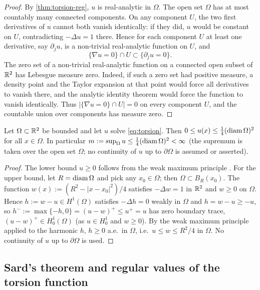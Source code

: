 \begin{proof}
By \cref{thm:torsion-reg}, $u$ is real-analytic in $\Omega$.  The open set
$\Omega$ has at most countably many connected components.  On any component
$U$, the two first derivatives of $u$ cannot both vanish identically: if they
did, $u$ would be constant on $U$, contradicting $-\Delta u=1$ there.  Hence
for each component $U$ at least one derivative, say $\partial_j u$, is a
non-trivial real-analytic function on $U$, and
\[
  \{\nabla u=0\}\cap U\subset\{\partial_j u=0\}.
\]
The zero set of a non-trivial real-analytic function on a connected open
subset of $\mathbb{R}^2$ has Lebesgue measure zero.  Indeed, if such a zero set had
positive measure, a density point and the Taylor expansion at that point
would force all derivatives to vanish there, and the analytic identity
theorem would force the function to vanish identically.  Thus
$|\{\nabla u=0\}\cap U|=0$ on every component $U$, and the countable union over
components has measure zero.
\end{proof}

\begin{lemma}\label{lem:linfty}
Let $\Omega\subset\mathbb{R}^2$ be bounded and let $u$ solve \eqref{eq:torsion}.
Then $0\le u(x)\le \tfrac14(\operatorname{diam}\Omega)^2$ for all $x\in\Omega$.
In particular $m:=\sup_{\Omega}u \le \tfrac14(\operatorname{diam}\Omega)^2<\infty$
\textup{(}the supremum is taken over the open set $\Omega$; no continuity of
$u$ up to $\partial\Omega$ is assumed or asserted\textup{)}.
\end{lemma}

\begin{proof}
The lower bound $u\ge 0$ follows from the weak maximum principle
\cite[Theorem~8.1]{GilbargTrudinger2001}.  For the upper bound, let $R=\operatorname{diam}\Omega$
and pick any $x_0\in\Omega$; then $\Omega\subset B_R(x_0)$.  The
function $w(x):=(R^2-|x-x_0|^2)/4$ satisfies $-\Delta w=1$ in $\mathbb{R}^2$ and
$w\ge 0$ on $\Omega$.  Hence $h:=w-u\in H^1(\Omega)$ satisfies $-\Delta h=0$
weakly in $\Omega$ and $h=w-u\ge -u$, so $h^-:=\max\{-h,0\}=(u-w)^+\le u^+=u$
has zero boundary trace, $(u-w)^+\in H^1_0(\Omega)$ (as $u\in H^1_0$ and
$w\ge 0$).  By the weak maximum principle
\cite[Theorem~8.1]{GilbargTrudinger2001} applied to the harmonic $h$,
$h\ge 0$ a.e.\ in $\Omega$, i.e.\ $u\le w\le R^2/4$ in $\Omega$.  No
continuity of $u$ up to $\partial\Omega$ is used.
\end{proof}

\subsection{Sard's theorem and regular values of the torsion function}

